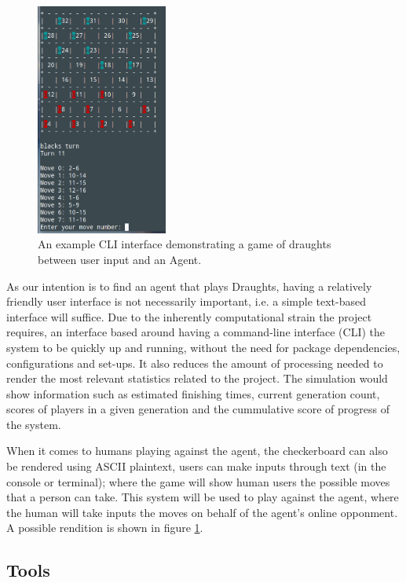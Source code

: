 \documentclass[12pt,a4paper]{article}
\begin{document}
    \begin{figure}
        \vspace{-30pt}
        \centering
        \caption{An example CLI interface demonstrating a game of draughts between user input and an Agent. \label{cli_humaninput}}
        \includegraphics[width=43mm]{cli_humanvsagent.png}
        \vspace{-20pt}
    \end{figure}

    As our intention is to find an agent that plays Draughts, having a relatively friendly user interface is not necessarily important, i.e. a simple text-based interface will suffice. Due to the inherently computational strain the project requires, an interface based around having a command-line interface (CLI) the system to be quickly up and running, without the need for package dependencies, configurations and set-ups. It also reduces the amount of processing needed to render the most relevant statistics related to the project. The simulation would show information such as estimated finishing times, current generation count, scores of players in a given generation and the cummulative score of progress of the system.

    When it comes to humans playing against the agent, the checkerboard can also be rendered using ASCII plaintext, users can make inputs through text (in the console or terminal); where the game will show human users the possible moves that a person can take. This system will be used to play against the agent, where the human will take inputs the moves on behalf of the agent's online opponment. A possible rendition is shown in figure \ref{cli_humaninput}.

\subsection*{Tools}
\end{document}
